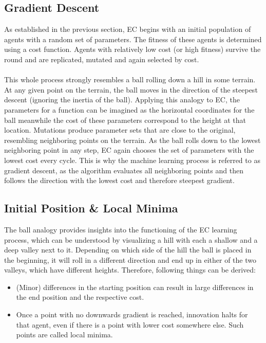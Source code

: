 \subsection{Gradient Descent}\label{subsec:gradient-descent}
As established in the previous section, EC begins with an initial population of agents with a random set of parameters.
The fitness of these agents is determined using a cost function.
Agents with relatively low cost (or high fitness) survive the round and are replicated, mutated and again selected by cost.
\\ \\
This whole process strongly resembles a ball rolling down a hill in some terrain.
At any given point on the terrain, the ball moves in the direction of the steepest descent (ignoring the inertia of the ball).
Applying this analogy to EC, the parameters for a function can be imagined as the horizontal coordinates for the ball meanwhile the cost of these parameters correspond to the height at that location.
Mutations produce parameter sets that are close to the original, resembling neighboring points on the terrain.
As the ball rolls down to the lowest neighboring point in any step, EC again chooses the set of parameters with the lowest cost every cycle.
This is why the machine learning process is referred to as gradient descent, as the algorithm evaluates all neighboring points and then follows the direction with the lowest cost and therefore steepest gradient.\cite{ibm2024}

\subsection{Initial Position \& Local Minima}\label{subsec:initial-position-&-local-minima}
The ball analogy provides insights into the functioning of the EC learning process, which can be understood by visualizing a hill with each a shallow and a deep valley next to it.
Depending on which side of the hill the ball is placed in the beginning, it will roll in a different direction and end up in either of the two valleys, which have different heights.
Therefore, following things can be derived:
\begin{itemize}
    \item (Minor) differences in the starting position can result in large differences in the end position and the respective cost.
    \item Once a point with no downwards gradient is reached, innovation halts for that agent, even if there is a point with lower cost somewhere else.
    Such points are called local minima.
\end{itemize}

